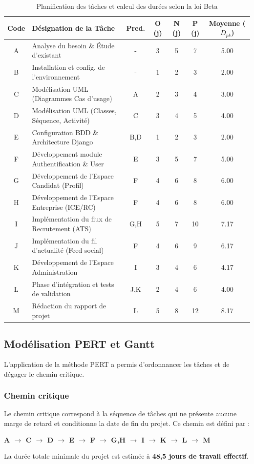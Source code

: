 \begin{table}[H]
\centering
\small
\begin{tabularx}{\textwidth}{c >{\raggedright\arraybackslash}X c c c c c}
\toprule
\textbf{Code} & \textbf{Désignation de la Tâche} & \textbf{Pred.} & \textbf{O (j)} & \textbf{N (j)} & \textbf{P (j)} & \textbf{Moyenne ($D_{pk}$)} \\
\midrule
A & Analyse du besoin \& Étude d'existant & - & 3 & 5 & 7 & 5.00 \\
B & Installation et config. de l'environnement & - & 1 & 2 & 3 & 2.00 \\
C & Modélisation UML (Diagrammes Cas d'usage) & A & 2 & 3 & 4 & 3.00 \\
D & Modélisation UML (Classes, Séquence, Activité) & C & 3 & 4 & 5 & 4.00 \\
E & Configuration BDD \& Architecture Django & B,D & 1 & 2 & 3 & 2.00 \\
F & Développement module Authentification \& User & E & 3 & 5 & 7 & 5.00 \\
G & Développement de l'Espace Candidat (Profil) & F & 4 & 6 & 8 & 6.00 \\
H & Développement de l'Espace Entreprise (ICE/RC) & F & 4 & 6 & 8 & 6.00 \\
I & Implémentation du flux de Recrutement (ATS) & G,H & 5 & 7 & 10 & 7.17 \\
J & Implémentation du fil d'actualité (Feed social) & F & 4 & 6 & 9 & 6.17 \\
K & Développement de l'Espace Administration & I & 3 & 4 & 6 & 4.17 \\
L & Phase d'intégration et tests de validation & J,K & 2 & 4 & 6 & 4.00 \\
M & Rédaction du rapport de projet & L & 5 & 8 & 12 & 8.17 \\
\bottomrule
\end{tabularx}
\caption{Planification des tâches et calcul des durées selon la loi Beta}
\label{tab:taches_pfa}
\end{table}

\subsection{Modélisation PERT et Gantt}
L'application de la méthode PERT a permis d'ordonnancer les tâches et de dégager le chemin critique.

\subsubsection{Chemin critique}
Le chemin critique correspond à la séquence de tâches qui ne présente aucune marge de retard et conditionne la date de fin du projet. Ce chemin est défini par :
\begin{center}
\textbf{A $\rightarrow$ C $\rightarrow$ D $\rightarrow$ E $\rightarrow$ F $\rightarrow$ G,H $\rightarrow$ I $\rightarrow$ K $\rightarrow$ L $\rightarrow$ M}
\end{center}
La durée totale minimale du projet est estimée à \textbf{48,5 jours de travail effectif}.

